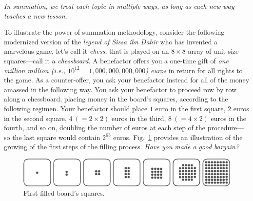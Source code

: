 \medskip

\noindent
{\em In summation, we treat each topic in multiple ways, as long as
  each new way teaches a new lesson.}

\bigskip








To illustrate the power of summation methodology, consider the
following modernized version of the {\it legend of Sissa ibn Dahir}
 who has invented a marvelous game,
let's call it {\it chess}, that is played on an $8 \times 8$ array of
unit-size squares---call it a {\it chessboard}.  A benefactor offers
you a one-time gift of {\em one million million (i.e., $10^{12} =
  1,000,000,000,000$) euros} in return for all rights to the game.  As
a counter-offer, you ask your benefactor instead for all of the money
amassed in the following way.  You ask your benefactor to proceed row
by row along a chessboard, placing money in the board's squares,
according to the following regimen.  Your benefactor should place $1$
euro in the first square, $2$ euros in the second square, $4 \ (= 2
\times 2)$ euros in the third, $8 \ (= 4 \times 2)$ euros in the
fourth, and so on, doubling the number of euros at each step of the
procedure---so the last square would contain $2^{63}$ euros.
Fig.~\ref{fig:Sissa} provides an illustration of the growing of the first steps of the filling process.
\noindent
{\em Have you made a good bargain?}
\begin{figure}[ht]
\begin{center}
       \includegraphics[scale=0.3]{FiguresMaths/chess}
\caption{First filled board's squares.}
       \label{fig:Sissa}
\end{center}
\end{figure}

